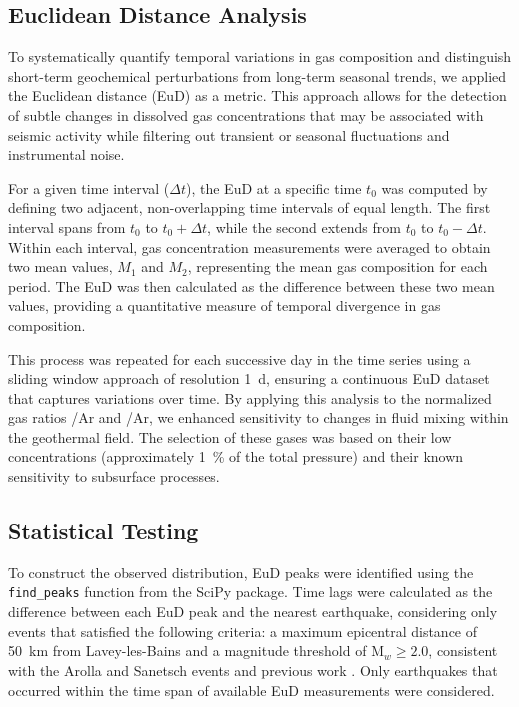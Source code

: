 \subsection{Euclidean Distance Analysis}\label{methods:EuD}
To systematically quantify temporal variations in gas composition and distinguish short-term geochemical perturbations from long-term seasonal trends, we applied the Euclidean distance (EuD) as a metric.
This approach allows for the detection of subtle changes in dissolved gas concentrations that may be associated with seismic activity while filtering out transient or seasonal fluctuations and instrumental noise.  

For a given time interval (\(\Delta t\)), the EuD at a specific time \(t_0\) was computed by defining two adjacent, non-overlapping time intervals of equal length.
The first interval spans from \(t_0\) to \(t_0 + \Delta t\), while the second extends from \(t_0\) to \(t_0 - \Delta t\).
Within each interval, gas concentration measurements were averaged to obtain two mean values, \(M_1\) and \(M_2\), representing the mean gas composition for each period.
The EuD was then calculated as the difference between these two mean values, providing a quantitative measure of temporal divergence in gas composition.

This process was repeated for each successive day in the time series using a sliding window approach of resolution \SI{1}{\day}, ensuring a continuous EuD dataset that captures variations over time.
By applying this analysis to the normalized gas ratios /Ar and /Ar, we enhanced sensitivity to changes in fluid mixing within the geothermal field.
The selection of these gases was based on their low concentrations (approximately \SI{1}{\percent} of the total pressure) and their known sensitivity to subsurface processes.

\subsection{Statistical Testing}\label{methods:stats}
To construct the observed distribution, EuD peaks were identified using the \texttt{find\_peaks} function from the SciPy package.
Time lags were calculated as the difference between each EuD peak and the nearest earthquake, considering only events that satisfied the following criteria: a maximum epicentral distance of \SI{50}{\kilo\meter} from Lavey-les-Bains and a magnitude threshold of M$_w \geq 2.0$, consistent with the Arolla and Sanetsch events and previous work \citep{chiodini2020co2}.
Only earthquakes that occurred within the time span of available EuD measurements were considered.

